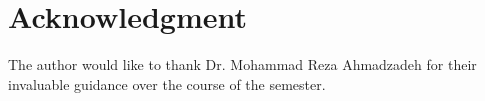 \documentclass[journal,onecolumn]{IEEEtran}
\begin{document}

%

\clearpage
\section*{Acknowledgment}


The author would like to thank Dr. Mohammad Reza Ahmadzadeh for their invaluable guidance over the course of the semester.


\ifCLASSOPTIONcaptionsoff
  \newpage
\fi






%
%

\end{document}
